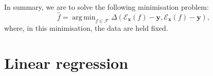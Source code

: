 \documentclass[10pt, a4paper]{article}
\DeclareMathOperator*{\argmin}{arg\,min}
\begin{document}
In summary, we are to solve the following minimisation problem: 
\begin{equation}
  \label{eq:least-squares}
  \hat{f} = \argmin_{f\in\mathcal{F}} \Delta(\mathcal{E}_{\bm{x}}(f) - \bm{y}, \mathcal{E}_{\bm{x}}(f) - \bm{y}),
\end{equation}
where, in this minimisation, the data are held fixed.

\section{Linear regression}
\end{document}

